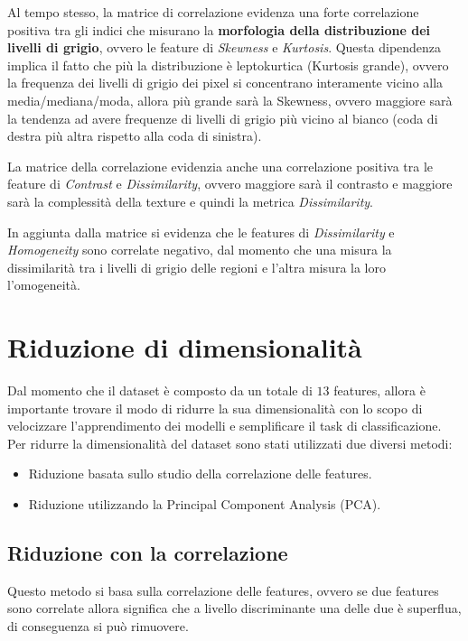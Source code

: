 Al tempo stesso, la matrice di correlazione evidenza una forte correlazione positiva
tra gli indici che misurano la \textbf{morfologia della distribuzione dei livelli
      di grigio}, ovvero le feature di \textit{Skewness} e \textit{Kurtosis}.
Questa dipendenza implica il fatto che più la distribuzione è leptokurtica
(Kurtosis grande), ovvero la frequenza dei livelli di grigio dei pixel si
concentrano interamente vicino alla media/mediana/moda, allora più grande sarà
la Skewness, ovvero maggiore sarà la tendenza ad avere frequenze di livelli di
grigio più vicino al bianco (coda di destra più altra rispetto alla coda di
sinistra).

La matrice della correlazione evidenzia anche una correlazione positiva tra le
feature di \textit{Contrast} e \textit{Dissimilarity}, ovvero maggiore sarà il
contrasto e maggiore sarà la complessità della texture e quindi la metrica
\textit{Dissimilarity}.

In aggiunta dalla matrice si evidenza che le features di \textit{Dissimilarity}
e \textit{Homogeneity} sono correlate negativo, dal momento che una misura la
dissimilarità tra i livelli di grigio delle regioni e l'altra misura la loro
l'omogeneità.
\section{Riduzione di dimensionalità} \label{sec:riduzone_di_dimensionalità}
Dal momento che il dataset è composto da un totale di $13$ features, allora
è importante trovare il modo di ridurre la sua dimensionalità con lo scopo di
velocizzare l'apprendimento dei modelli e semplificare il task di classificazione.
Per ridurre la dimensionalità del dataset sono stati utilizzati due diversi metodi:
\begin{itemize}
      \item Riduzione basata sullo studio della correlazione delle features.
      \item Riduzione utilizzando la Principal Component Analysis (PCA).
\end{itemize}
\subsection{Riduzione con la correlazione} \label{sec:riduzione_correlazione}
Questo metodo si basa sulla correlazione delle features, ovvero se due features
sono correlate allora significa che a livello discriminante una delle due è
superflua, di conseguenza si può rimuovere.

